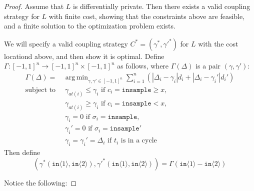\documentclass[12pt]{article}
\newcommand{\gguard}[1][x]{\texttt{insample}\geq#1}
\newcommand{\lguard}[1][x]{\texttt{insample} < #1}
\newcommand{\brangle}[1]{\langle#1 \rangle}
\DeclareMathOperator*{\argmin}{arg\,min}
\theoremstyle{definition}
\begin{document}
\begin{proof}
    Assume that $L$ is differentially private. Then there exists a valid coupling strategy for $L$ with finite cost, showing that the constraints above are feasible, and a finite solution to the optimization problem exists.  

    We will specify a valid coupling strategy $C^* = (\gamma^*, {\gamma'}^*)$ for $L$ with the cost locationd above, and then show it is optimal. Define $\Gamma: [-1, 1]^n \to [-1, 1]^n \times [-1, 1]^n$ as follows, where $\Gamma(\Delta)$ is a pair $(\gamma, \gamma')$: 
    \begin{align*}
        \Gamma(\Delta) = &\argmin_{\gamma, \gamma' \in [-1, 1]^n} \sum_{i = 1}^n \left(|\Delta_i - \gamma_i| d_i + |\Delta_i - \gamma_i'|d_i' \right)\\ 
        \text{subject to }
        &\ \gamma_{at(i)} \leq \gamma_i \text{ if } c_i = \gguard, \\
        &\ \gamma_{at(i)} \geq \gamma_i \text{ if } c_i = \lguard, \\
        &\ \gamma_i = 0 \text{ if } \sigma_i = \texttt{insample}, \\
        &\ \gamma_i' = 0 \text{ if } \sigma_i = \texttt{insample}'\\
        &\ \gamma_i = \gamma_i'= \Delta_i \text{ if } t_i \text{ is in a cycle}
    \end{align*}
    Then define \[(\gamma^*(\texttt{in}\brangle{1}, \texttt{in}\brangle{2}), {\gamma'}^*(\texttt{in}\brangle{1}, \texttt{in}\brangle{2})) = \Gamma(\texttt{in}\brangle{1} - \texttt{in}\brangle{2})\]

    Notice the following: 


\end{proof}
\end{document}
